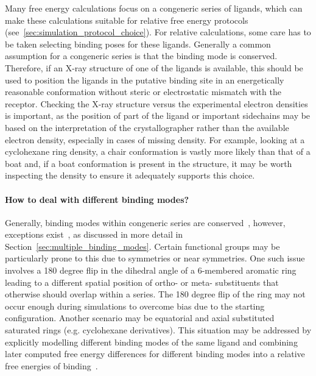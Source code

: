 \documentclass[9pt,bestpractices]{livecoms}
\begin{document}
Many free energy calculations focus on a congeneric series of ligands, which can make these calculations suitable for relative free energy protocols (see~\ref{sec:simulation_protocol_choice}). For relative calculations, some care has to be taken selecting binding poses for these ligands. Generally a common assumption for a congeneric series is that the binding mode is conserved. Therefore, if an X-ray structure of one of the ligands is available, this should be used to position the ligands in the putative binding site in an energetically reasonable conformation without steric or electrostatic mismatch with the receptor. Checking the X-ray structure versus the experimental electron densities is important, as the position of part of the ligand or important sidechains may be based on the interpretation of the crystallographer rather than the available electron density, especially in cases of missing density. For example, looking at a cyclohexane ring density, a chair conformation is vastly more likely than that of a boat and, if a boat conformation is present in the structure, it may be worth inspecting the density to ensure it adequately supports this choice. 

\paragraph{How to deal with different binding modes?}
Generally, binding modes within congeneric series are conserved~\cite{wacker2010conserved}, however, exceptions exist~\cite{brandt2011congeneric,nazare2005probing}, as discussed in more detail in Section~\ref{sec:multiple_binding_modes}. Certain  functional groups may be particularly prone to this due to symmetries or near symmetries. One such issue involves a 180 degree flip in the dihedral angle of a 6-membered aromatic ring leading to a different spatial position of ortho- or meta- substituents that otherwise should overlap within a series. The 180 degree flip of the ring may not occur enough during simulations to overcome bias due to the starting configuration. Another scenario may be equatorial and axial substituted saturated rings (e.g. cyclohexane derivatives). This situation may be addressed by explicitly modelling different binding modes of the same ligand and combining later computed free energy differences for different binding modes into a relative free energies of binding~\cite{kaus2015how}.
\end{document}

